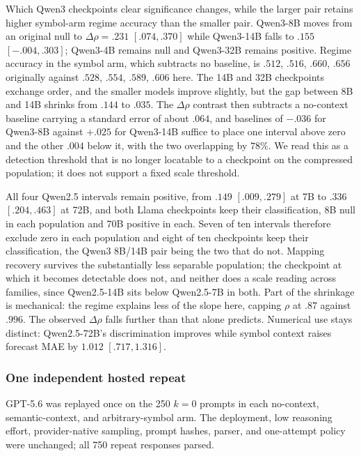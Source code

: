 Which Qwen3 checkpoints clear significance changes, while the larger pair retains
higher symbol-arm regime accuracy than the smaller pair.
Qwen3-8B moves from an original null to \(\Delta\rho=.231\) \([.074,.370]\) while
Qwen3-14B falls to \(.155\) \([-.004,.303]\); Qwen3-4B remains null and Qwen3-32B
remains positive. Regime accuracy in the symbol arm, which subtracts no baseline,
is \(.512\), \(.516\), \(.660\), \(.656\) originally against \(.528\),
\(.554\), \(.589\), \(.606\) here. The 14B and 32B checkpoints exchange order,
and the smaller models improve slightly, but the gap between 8B and 14B shrinks
from \(.144\) to \(.035\).
The \(\Delta\rho\) contrast then subtracts a no-context baseline carrying a
standard error of about \(.064\), and baselines of \(-.036\) for Qwen3-8B against
\(+.025\) for Qwen3-14B suffice to place one interval above zero and the other
\(.004\) below it, with the two overlapping by \(78\%\). We read this as a
detection threshold that is no longer locatable to a checkpoint on the compressed
population; it does not support a fixed scale threshold.

All four Qwen2.5 intervals remain positive, from \(.149\) \([.009,.279]\) at 7B to
\(.336\) \([.204,.463]\) at 72B, and both Llama checkpoints keep their
classification, 8B null in each population and 70B positive in each. Seven of ten
intervals therefore exclude zero in each population and eight of ten checkpoints
keep their classification, the Qwen3 8B/14B pair being the two that do not. Mapping
recovery survives the substantially less separable population; the checkpoint at
which it becomes detectable does not, and neither does a scale reading across
families, since Qwen2.5-14B sits below Qwen2.5-7B in both. Part of the shrinkage
is mechanical: the regime explains less of the slope here, capping \(\rho\) at
\(.87\) against \(.996\). The observed \(\Delta\rho\) falls further than that alone
predicts. Numerical use stays distinct:
Qwen2.5-72B's discrimination improves while symbol context raises forecast MAE by
\(1.012\) \([.717,1.316]\).


\subsubsection{One independent hosted repeat}
GPT-5.6 was replayed once on the 250 \(k=0\) prompts in each no-context,
semantic-context, and arbitrary-symbol arm. The deployment, low reasoning effort,
provider-native sampling, prompt hashes, parser, and one-attempt policy were
unchanged; all 750 repeat responses parsed.

